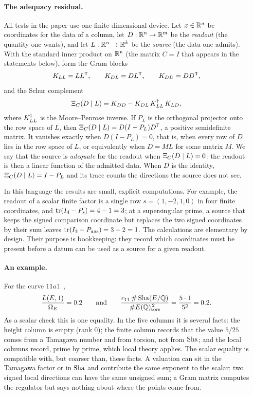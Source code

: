 \paragraph{The adequacy residual.}
All tests in the paper use one finite-dimensional device.  Let $x\in\mathbb{R}^n$
be coordinates for the data of a column, let $D:\mathbb{R}^n\to\mathbb{R}^m$ be the
\emph{readout} (the quantity one wants), and let $L:\mathbb{R}^n\to\mathbb{R}^k$ be the
\emph{source} (the data one admits).  With the standard inner product on
$\mathbb{R}^n$ (the matrix $C=I$ that appears in the statements below), form the
Gram blocks
\[
  K_{LL}=LL^{\mathsf T},\qquad K_{DL}=DL^{\mathsf T},\qquad K_{DD}=DD^{\mathsf T},
\]
and the Schur complement~\citep{Zhang2005schur,HornJohnson2013}
\[
  \Xi_C(D\mid L)=K_{DD}-K_{DL}\,K_{LL}^{\dagger}\,K_{LD},
\]
where $K_{LL}^{\dagger}$ is the Moore--Penrose inverse.  If $P_L$ is the orthogonal
projector onto the row space of $L$, then $\Xi_C(D\mid L)=D(I-P_L)D^{\mathsf T}$,
a positive semidefinite matrix.  It vanishes exactly when $D(I-P_L)=0$,
that is, when every row of $D$ lies in the row space of $L$, or
equivalently when $D=ML$ for some matrix $M$.  We say that the source is
\emph{adequate} for the readout when $\Xi_C(D\mid L)=0$: the readout is then a
linear function of the admitted data.  When $D$ is the identity, $\Xi_C(D\mid L)=I-P_L$
and its trace counts the directions the source does not see.

In this language the results are small, explicit computations.  For
example, the readout of a scalar finite factor is a single row
$s=(1,-2,1,0)$ in four finite coordinates, and $\operatorname{tr}(I_4-P_s)=4-1=3$; at
a supersingular prime, a source that keeps the signed comparison
coordinate but replaces the two signed coordinates by their sum leaves
$\operatorname{tr}(I_3-P_{\mathrm{uns}})=3-2=1$.  The calculations are elementary
by design.  Their purpose is bookkeeping: they record which coordinates
must be present before a datum can be used as a source for a given
readout.

\paragraph{An example.}
For the curve $11a1$~\citep{Cremona1997,LMFDB},
\[
  \frac{L(E,1)}{\Omega_E}=0.2
  \qquad\text{and}\qquad
  \frac{c_{11}\,\#\operatorname{Sha}(E/\mathbb{Q})}{\#E(\mathbb{Q})_{\operatorname{tors}}^{\,2}}
  =\frac{5\cdot1}{5^2}=0.2 .
\]
As a scalar check this is one equality.  In the five columns it is several
facts: the height column is empty (rank $0$); the finite column records
that the value $5/25$ comes from a Tamagawa number and from torsion, not
from $\operatorname{Sha}$; and the local columns record, prime by prime, which local
theory applies.  The scalar equality is compatible with, but coarser
than, these facts.  A valuation can sit in the Tamagawa factor or in
$\operatorname{Sha}$ and contribute the same exponent to the scalar; two signed local
directions can have the same unsigned sum; a Gram matrix computes the
regulator but says nothing about where the points come from.

